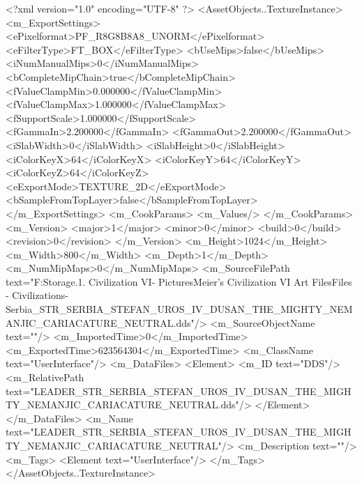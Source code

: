 <?xml version="1.0" encoding="UTF-8" ?>
<AssetObjects..TextureInstance>
	<m_ExportSettings>
		<ePixelformat>PF_R8G8B8A8_UNORM</ePixelformat>
		<eFilterType>FT_BOX</eFilterType>
		<bUseMips>false</bUseMips>
		<iNumManualMips>0</iNumManualMips>
		<bCompleteMipChain>true</bCompleteMipChain>
		<fValueClampMin>0.000000</fValueClampMin>
		<fValueClampMax>1.000000</fValueClampMax>
		<fSupportScale>1.000000</fSupportScale>
		<fGammaIn>2.200000</fGammaIn>
		<fGammaOut>2.200000</fGammaOut>
		<iSlabWidth>0</iSlabWidth>
		<iSlabHeight>0</iSlabHeight>
		<iColorKeyX>64</iColorKeyX>
		<iColorKeyY>64</iColorKeyY>
		<iColorKeyZ>64</iColorKeyZ>
		<eExportMode>TEXTURE_2D</eExportMode>
		<bSampleFromTopLayer>false</bSampleFromTopLayer>
	</m_ExportSettings>
	<m_CookParams>
		<m_Values/>
	</m_CookParams>
	<m_Version>
		<major>1</major>
		<minor>0</minor>
		<build>0</build>
		<revision>0</revision>
	</m_Version>
	<m_Height>1024</m_Height>
	<m_Width>800</m_Width>
	<m_Depth>1</m_Depth>
	<m_NumMipMaps>0</m_NumMipMaps>
	<m_SourceFilePath text="F:\Mod Storage\2.1. Civilization VI\Mods\Archive - Pictures\Sid Meier's Civilization VI Art Files\Art Files - Civilizations\Civilization - Serbia\LEADER_STR_SERBIA_STEFAN_UROS_IV_DUSAN_THE_MIGHTY_NEMANJIC_CARIACATURE_NEUTRAL.dds"/>
	<m_SourceObjectName text=""/>
	<m_ImportedTime>0</m_ImportedTime>
	<m_ExportedTime>623564304</m_ExportedTime>
	<m_ClassName text="UserInterface"/>
	<m_DataFiles>
		<Element>
			<m_ID text="DDS"/>
			<m_RelativePath text="LEADER_STR_SERBIA_STEFAN_UROS_IV_DUSAN_THE_MIGHTY_NEMANJIC_CARIACATURE_NEUTRAL.dds"/>
		</Element>
	</m_DataFiles>
	<m_Name text="LEADER_STR_SERBIA_STEFAN_UROS_IV_DUSAN_THE_MIGHTY_NEMANJIC_CARIACATURE_NEUTRAL"/>
	<m_Description text=""/>
	<m_Tags>
		<Element text="UserInterface"/>
	</m_Tags>
</AssetObjects..TextureInstance>

